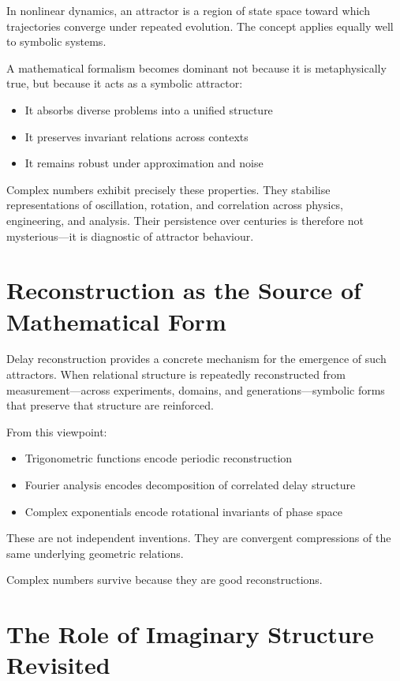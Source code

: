\documentclass[12pt]{book}  %
\begin{document}
In nonlinear dynamics, an attractor is a region of state space toward which trajectories converge under repeated evolution. The concept applies equally well to symbolic systems.

A mathematical formalism becomes dominant not because it is metaphysically true, but because it acts as a symbolic attractor:

\begin{itemize}
    \item It absorbs diverse problems into a unified structure
    \item It preserves invariant relations across contexts
    \item It remains robust under approximation and noise
\end{itemize}

Complex numbers exhibit precisely these properties. They stabilise representations of oscillation, rotation, and correlation across physics, engineering, and analysis. Their persistence over centuries is therefore not mysterious—it is diagnostic of attractor behaviour.

\section*{Reconstruction as the Source of Mathematical Form}

Delay reconstruction provides a concrete mechanism for the emergence of such attractors. When relational structure is repeatedly reconstructed from measurement—across experiments, domains, and generations—symbolic forms that preserve that structure are reinforced.

From this viewpoint:

\begin{itemize}
    \item Trigonometric functions encode periodic reconstruction
    \item Fourier analysis encodes decomposition of correlated delay structure
    \item Complex exponentials encode rotational invariants of phase space
\end{itemize}

These are not independent inventions. They are convergent compressions of the same underlying geometric relations.

Complex numbers survive because they are good reconstructions.

\section*{The Role of Imaginary Structure Revisited}
\end{document}
